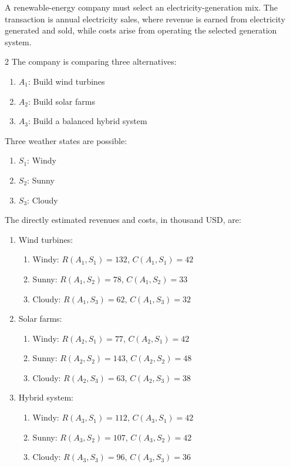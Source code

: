 A renewable-energy company must select an electricity-generation mix.
The transaction is annual electricity sales, where revenue is earned from
electricity generated and sold, while costs arise from operating the selected
generation system.

\begin{multicols}{2}
	The company is comparing three alternatives:
	\begin{enumerate}[label=\arabic*.]
		\item \(A_1\): Build wind turbines
		\item \(A_2\): Build solar farms
		\item \(A_3\): Build a balanced hybrid system
	\end{enumerate}
	
	Three weather states are possible:
	\begin{enumerate}[label=\arabic*.]
		\item \(S_1\): Windy
		\item \(S_2\): Sunny
		\item \(S_3\): Cloudy
	\end{enumerate}
	
	\columnbreak
	
	The directly estimated revenues and costs, in thousand USD, are:
	\begin{enumerate}[label=\arabic*.]
		\item Wind turbines:
		\begin{enumerate}[label=\roman*)]
			\item Windy:
			\(R(A_1,S_1)=132\), \(C(A_1,S_1)=42\)
			
			\item Sunny:
			\(R(A_1,S_2)=78\), \(C(A_1,S_2)=33\)
			
			\item Cloudy:
			\(R(A_1,S_3)=62\), \(C(A_1,S_3)=32\)
		\end{enumerate}
		
		\item Solar farms:
		\begin{enumerate}[label=\roman*)]
			\item Windy:
			\(R(A_2,S_1)=77\), \(C(A_2,S_1)=42\)
			
			\item Sunny:
			\(R(A_2,S_2)=143\), \(C(A_2,S_2)=48\)
			
			\item Cloudy:
			\(R(A_2,S_3)=63\), \(C(A_2,S_3)=38\)
		\end{enumerate}
		
		\item Hybrid system:
		\begin{enumerate}[label=\roman*)]
			\item Windy:
			\(R(A_3,S_1)=112\), \(C(A_3,S_1)=42\)
			
			\item Sunny:
			\(R(A_3,S_2)=107\), \(C(A_3,S_2)=42\)
			
			\item Cloudy:
			\(R(A_3,S_3)=96\), \(C(A_3,S_3)=36\)
		\end{enumerate}
	\end{enumerate}
\end{multicols}

